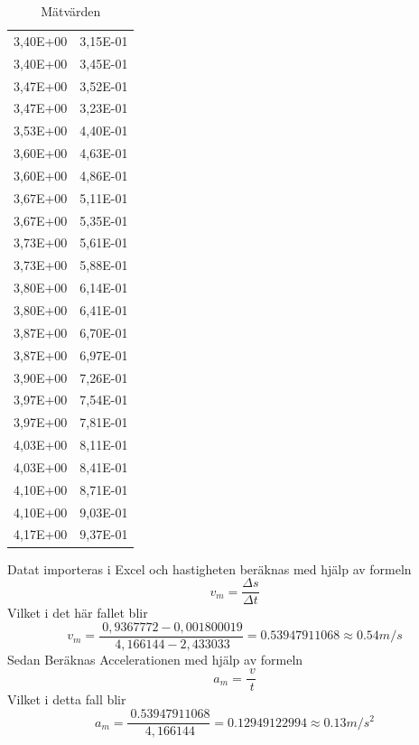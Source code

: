 \documentclass[11p, titlepage, oneside, a4paper]{article}
\begin{document}
\begin{table}
\begin{center}
\begin{tabular}{ |c|c| }
                3,40E+00 & 3,15E-01 \\
                3,40E+00 & 3,45E-01 \\
                3,47E+00 & 3,52E-01 \\
                3,47E+00 & 3,23E-01 \\
                3,53E+00 & 4,40E-01 \\
                3,60E+00 & 4,63E-01 \\
                3,60E+00 & 4,86E-01 \\
                3,67E+00 & 5,11E-01 \\
                3,67E+00 & 5,35E-01 \\
                3,73E+00 & 5,61E-01 \\
                3,73E+00 & 5,88E-01 \\
                3,80E+00 & 6,14E-01 \\
                3,80E+00 & 6,41E-01 \\
                3,87E+00 & 6,70E-01 \\
                3,87E+00 & 6,97E-01 \\
                3,90E+00 & 7,26E-01 \\
                3,97E+00 & 7,54E-01 \\
                3,97E+00 & 7,81E-01 \\
                4,03E+00 & 8,11E-01 \\
                4,03E+00 & 8,41E-01 \\
                4,10E+00 & 8,71E-01 \\
                4,10E+00 & 9,03E-01 \\
                4,17E+00 & 9,37E-01 \\
                \hline
            \end{tabular}
                \caption{Mätvärden}
                \label{table:result}
            \end{center}
        \end{table}            



    Datat importeras i Excel och hastigheten beräknas med hjälp av formeln
    \begin{equation}
        v_m = \frac{\Delta s}{\Delta t}
    \end{equation}
    Vilket i det här fallet blir
    \begin{equation}
        v_m = \frac{\ 0,9367772 - 0,001800019}{\ 4,166144 - 2,433033} = 0.53947911068 \approx 0.54 m/s
    \end{equation}
    Sedan Beräknas Accelerationen med hjälp av formeln
    \begin{equation}
        a_m = \frac{\ v}{\ t}
    \end{equation}
    Vilket i detta fall blir
    \begin{equation}
        a_m = \frac{\ 0.53947911068}{\ 4,166144} = 0.12949122994 \approx 0.13 m/s^2
    \end{equation}
\end{document}
